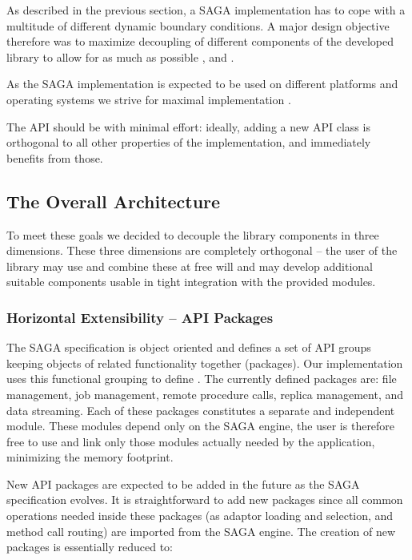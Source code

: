 	As described in the previous section, a SAGA implementation has to cope 
	with a multitude of different dynamic boundary conditions. A major design
	objective therefore was to maximize decoupling of different components
	of the developed library to allow for as much as possible , 
	 and .

	As the SAGA implementation is expected to be used on different platforms
	and operating systems we strive for maximal implementation . 

  The API should be  with minimal effort: ideally,
  adding a new API class is orthogonal to all other properties of the
  implementation, and immediately benefits from those.


\subsection{The Overall Architecture}

	To meet these goals we decided to decouple the library components
	in three dimensions. These three dimensions are completely orthogonal -- 
	the user of the library may use and combine these at free will and may 
	develop additional suitable components usable in tight integration with 
	the provided modules.

\subsubsection{Horizontal Extensibility -- API Packages}
\label{ssec:apipackages}

	The SAGA specification is object oriented and defines a set of API groups
	keeping objects of related functionality together (packages). Our implementation
	uses this functional grouping to define .	The currently 
	defined packages are: file management, job management, remote procedure calls, 
  replica management, and data streaming. Each of 
	these packages constitutes a separate and independent module. 
	These modules depend only on the SAGA engine, the user is therefore free to 
	use and link only those modules actually needed by the application, minimizing 
	the memory footprint.
	
	New API packages are expected to be added in the future as the SAGA specification
	evolves. It is straightforward to add new packages since all common operations 
	needed inside these packages (as adaptor loading and selection, and method call routing) 
	are imported from the SAGA engine.  The creation of new packages is
  essentially reduced to:


